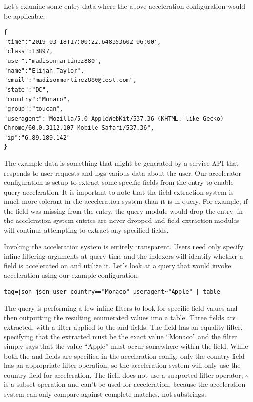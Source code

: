 {Let's examine some entry data where the above acceleration
configuration would be applicable:

\begin{Verbatim}[breaklines=true]
{
"time":"2019-03-18T17:00:22.648353602-06:00",
"class":13897,
"user":"madisonmartinez880",
"name":"Elijah Taylor",
"email":"madisonmartinez880@test.com",
"state":"DC",
"country":"Monaco",
"group":"toucan",
"useragent":"Mozilla/5.0 AppleWebKit/537.36 (KHTML, like Gecko) 
Chrome/60.0.3112.107 Mobile Safari/537.36",
"ip":"6.89.189.142"
}
\end{Verbatim}

The example data is something that might be generated by a service API
that responds to user requests and logs various data about the user.
Our accelerator configuration is setup to extract some specific fields
from the entry to enable query acceleration. It is important to note
that the field extraction system is much more tolerant in the
acceleration system than it is in query. For example, if the field
 was missing from the entry, the  query module would drop
the entry; in the acceleration system entries are never dropped and
field extraction modules will continue attempting to extract any
specified fields.

Invoking the acceleration system is entirely transparent. Users need
only specify inline filtering arguments at query time and the indexers
will identify whether a field is accelerated on and utilize it. Let's
look at a query that would invoke acceleration using our example
configuration:

\begin{Verbatim}[breaklines=true]
tag=json json user country=="Monaco" useragent~"Apple" | table
\end{Verbatim}

The query is performing a few inline filters to look for specific field
values and then outputting the resulting enumerated values into a table.
Three fields are extracted, with a filter applied to the
 and  fields. The  field has an
equality filter, specifying that the extracted  must be the
exact value ``Monaco'' and the  filter simply says that the
value ``Apple'' must occur somewhere within the  field.
While both the  and  fields are specified in the
acceleration config, only the country field has an appropriate
filter operation, so the acceleration system will only use the
country field for acceleration. The  field does not
use a supported filter operator; \textasciitilde{} is a subset operation and can't
be used for acceleration, because the acceleration system can only compare
against complete matches, not substrings.

}
